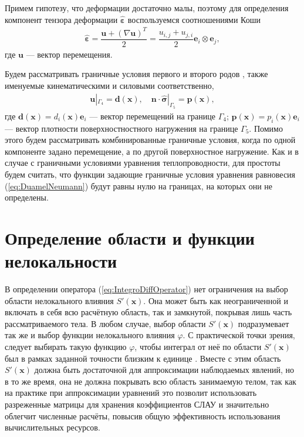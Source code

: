 Примем гипотезу, что деформации достаточно малы, поэтому для определения компонент тензора деформации $\widehat{\boldsymbol{\varepsilon}}$ воспользуемся соотношениями \mbox{Коши \cite{MSS}}
\begin{gather*}
	\widehat{\boldsymbol{\varepsilon}} = 
	\dfrac{\boldsymbol{u} + (\nabla \boldsymbol{u})^T}{2} = 
	\dfrac{u_{i, j} + u_{j, i}}{2} \boldsymbol{e}_i \otimes \boldsymbol{e}_j,
\end{gather*}
где $\boldsymbol{u}$ --- вектор перемещения.

Будем рассматривать граничные условия первого и второго родов \cite{MSS}, также именуемые кинематическими и силовыми соответственно,
\begin{gather}
	\label{eq:StressBoundaries}
	\boldsymbol{u}|_{\Gamma_4} = \boldsymbol{d} (\boldsymbol{x}),
	\quad
	\boldsymbol{n} \cdot \widehat{\boldsymbol{\sigma}}|_{\Gamma_5} = \boldsymbol{p} (\boldsymbol{x}),
\end{gather}
где $\boldsymbol{d} (\boldsymbol{x}) = d_i (\boldsymbol{x}) \boldsymbol{e}_i$ --- вектор перемещений на границе $\Gamma_4$;
$\boldsymbol{p} (\boldsymbol{x}) = p_i (\boldsymbol{x}) \boldsymbol{e}_i$ --- вектор плотности поверхностностного нагружения на границе $\Gamma_5$. Помимо этого будем рассматривать комбинированные граничные условия, когда по одной компоненте задано перемещение, а по другой поверхностное нагружение. Как и в случае с граничными условиями уравнения теплопроводности, для простоты будем считать, что функции задающие граничные условия уравнения равновесия (\ref{eq:DuamelNeumann}) будут равны нулю на границах, на которых они не определены.

\section{Определение области и функции нелокальности}\label{sec:BasicRelations/InfluenceFunction}

В определении оператора (\ref{eq:IntegroDiffOperator}) нет ограничения на выбор области нелокального влияния $S'(\boldsymbol{x})$. Она  может быть как неограниченной и включать в себя всю расчётную область, так и замкнутой, покрывая лишь часть рассматриваемого тела. В любом случае, выбор области $S'(\boldsymbol{x})$ подразумевает так же и выбор функции нелокального влияния $\varphi$. С практической точки зрения, следует выбирать такую функцию $\varphi$, чтобы интеграл от неё по области $S'(\boldsymbol{x})$ был в рамках заданной точности близким к единице \cite{Eringen3}. Вместе с этим область $S'(\boldsymbol{x})$ должна быть достаточной для аппроксимации наблюдаемых явлений, но в то же время, она не должна покрывать всю область занимаемую телом, так как на практике при аппроксимации уравнений это позволит использовать разреженные матрицы для хранения коэффициентов СЛАУ \cite{Pisanetzkiy} и значительно облегчит численные расчёты, повысив общую эффективность использования вычислительных ресурсов. 

